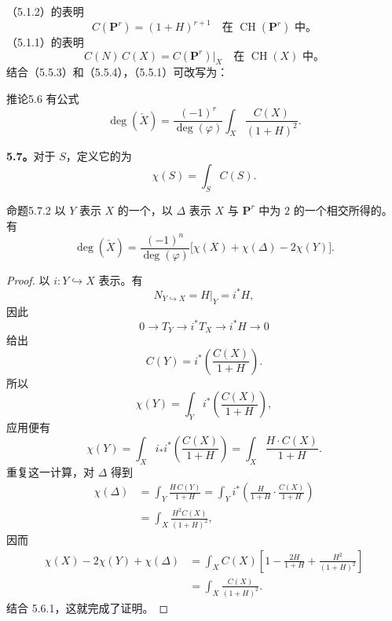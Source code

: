 （5.1.2）的表明
\[
C(\mathbf P^r)=(1+H)^{r+1}
\quad\text{在 }\operatorname{CH}(\mathbf P^r)\text{ 中}。
\tag{5.5.3}
\]
（5.1.1）的表明
\[
C(N)\,C(X)=C(\mathbf P^r)|_X
\quad\text{在 }\operatorname{CH}(X)\text{ 中}。
\tag{5.5.4}
\]
结合（5.5.3）和（5.5.4），（5.5.1）可改写为：
\begin{SGAresult}{推论}{5.6}
有公式
\[
\deg(\check X)=\frac{(-1)^r}{\deg(\varphi)}
\int_X\frac{C(X)}{(1+H)^2}.
\tag{5.6.1}
\]
\end{SGAresult}

\textbf{5.7。}对于 $S$，定义它的为
\[
\chi(S)=\int_S C(S).
\tag{5.7.1}
\]
\begin{SGAresult}{命题}{5.7.2}
以 $Y$ 表示 $X$ 的一个，以 $\Delta$ 表示 $X$ 与 $\mathbf P^r$ 中为 $2$ 的一个相交所得的。有
\[
\deg(\check X)=\frac{(-1)^n}{\deg(\varphi)}
\bigl[\chi(X)+\chi(\Delta)-2\chi(Y)\bigr].
\tag{5.7.3}
\]
\end{SGAresult}
\begin{proof}
以 $i:Y\hookrightarrow X$ 表示。有
\[
N_{Y\hookrightarrow X}=H|_Y=i^*H,
\]
因此
\[
0\longrightarrow T_Y\longrightarrow i^*T_X
\longrightarrow i^*H\longrightarrow0
\]
给出
\[
C(Y)=i^*\left(\frac{C(X)}{1+H}\right).
\tag{5.7.4}
\]
所以
\[
\chi(Y)=\int_Yi^*\left(\frac{C(X)}{1+H}\right),
\]
应用便有
\[
\chi(Y)=\int_Xi_*i^*\left(\frac{C(X)}{1+H}\right)
=\int_X\frac{H\cdot C(X)}{1+H}.
\tag{5.7.5}
\]
重复这一计算，对 $\Delta$ 得到
\[
\begin{aligned}
\chi(\Delta)
&=\int_Y\frac{H\,C(Y)}{1+H}
=\int_Yi^*\left(\frac{H}{1+H}\cdot\frac{C(X)}{1+H}\right)\\
&=\int_X\frac{H^2C(X)}{(1+H)^2},
\end{aligned}
\tag{5.7.6}
\]
因而
\[
\begin{aligned}
\chi(X)-2\chi(Y)+\chi(\Delta)
&=\int_X C(X)\left[1-\frac{2H}{1+H}+\frac{H^2}{(1+H)^2}\right]\\
&=\int_X\frac{C(X)}{(1+H)^2}.
\end{aligned}
\]
结合 5.6.1，这就完成了证明。
\end{proof}

